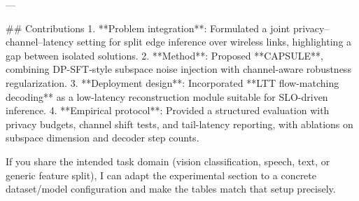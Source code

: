 ---

## Contributions  
1. **Problem integration**: Formulated a joint privacy–channel–latency setting for split edge inference over wireless links, highlighting a gap between isolated solutions.  
2. **Method**: Proposed **CAPSULE**, combining DP-SFT-style subspace noise injection with channel-aware robustness regularization.  
3. **Deployment design**: Incorporated **LTT flow-matching decoding** as a low-latency reconstruction module suitable for SLO-driven inference.  
4. **Empirical protocol**: Provided a structured evaluation with privacy budgets, channel shift tests, and tail-latency reporting, with ablations on subspace dimension and decoder step counts.

If you share the intended task domain (vision classification, speech, text, or generic feature split), I can adapt the experimental section to a concrete dataset/model configuration and make the tables match that setup precisely.